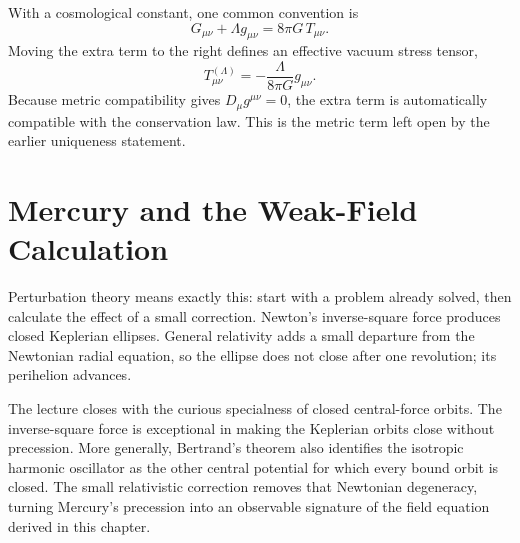 With a cosmological constant, one common convention is
\begin{equation}
 G_{\mu\nu}+\Lambda g_{\mu\nu}
 =
 8\pi G\,T_{\mu\nu}.
\end{equation}
Moving the extra term to the right defines an effective vacuum stress tensor,
\begin{equation}
 T_{\mu\nu}^{(\Lambda)}
 =
 -\frac{\Lambda}{8\pi G}g_{\mu\nu}.
\end{equation}
Because metric compatibility gives \(D_\mu g^{\mu\nu}=0\), the extra term is
automatically compatible with the conservation law. This is the metric term
left open by the earlier uniqueness statement.

\section{Mercury and the Weak-Field Calculation}

\begin{classroomqa}
\end{classroomqa}

Perturbation theory means exactly this: start with a problem already solved,
then calculate the effect of a small correction. Newton's inverse-square
force produces closed Keplerian ellipses. General relativity adds a small
departure from the Newtonian radial equation, so the ellipse does not close
after one revolution; its perihelion advances.

The lecture closes with the curious specialness of closed central-force
orbits. The inverse-square force is exceptional in making the Keplerian
orbits close without precession. More generally, Bertrand's theorem also
identifies the isotropic harmonic oscillator as the other central potential
for which every bound orbit is closed. The small relativistic correction
removes that Newtonian degeneracy, turning Mercury's precession into an
observable signature of the field equation derived in this chapter.
